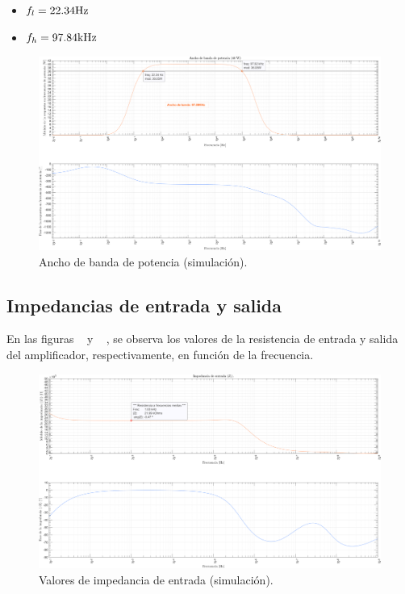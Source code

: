 \begin{itemize}
    \item $f_l = 22.34 \si[per-mode=symbol]{\hertz}$
    \item $f_h = 97.84 \si[per-mode=symbol]{\kilo\hertz}$
\end{itemize}

\vfill

\clearpage

\begin{figure}[H]
    \centering
    \includegraphics[angle=90,scale=0.45]{./img/simulaciones/BW/Power_BW.png}
    \caption{Ancho de banda de potencia (simulación).}
    \label{fig:Power_BW_sim}
\end{figure}

\clearpage

\subsection{Impedancias de entrada y salida}

\par En las figuras ~ y ~ , se observa los valores de la resistencia de entrada y salida del amplificador, respectivamente, en función de la frecuencia.

\vfill

\clearpage

\begin{figure}[H]
    \centering
    \includegraphics[angle=90,scale=0.45]{./img/simulaciones/Impedance/amplifier_Zi.png}
    \caption{Valores de impedancia de entrada (simulación).}
    \label{fig:amplifier_Zi_sim}
\end{figure}

